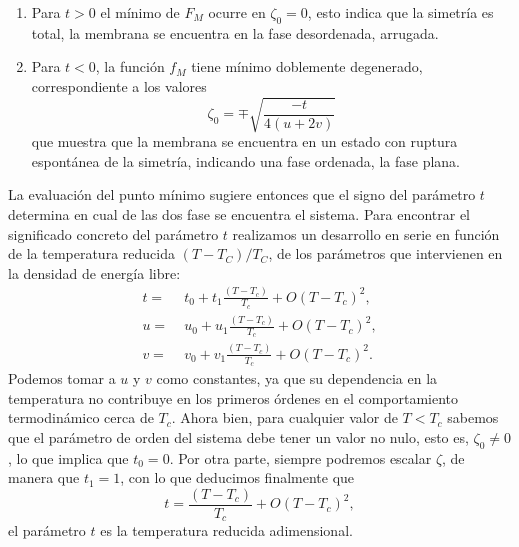 \begin{enumerate}
\item Para $t>0$ el mínimo de $F_M$ ocurre en $\zeta_0=0$, esto indica que la
  simetría es total, la membrana se encuentra en la fase desordenada,
  arrugada.
\item Para $t<0$, la función $f_M$ tiene mínimo doblemente
  degenerado, correspondiente a los valores
  \begin{equation}\label{zeta_0}
    \zeta_0=\mp \sqrt{\frac{-t}{4(u+2v)}}
  \end{equation}
  que muestra que la membrana se encuentra en un estado con ruptura espontánea
  de la simetría, indicando una fase ordenada, la fase plana. 
\end{enumerate}

La evaluación del punto mínimo sugiere entonces que el
signo del parámetro $t$ determina en cual de las dos fase se encuentra el
sistema. Para encontrar el significado concreto del parámetro $t$
realizamos un desarrollo en serie en función de la temperatura reducida
$(T-T_C)/T_C$, de los parámetros que intervienen en la densidad de energía libre:
\begin{align*}
t=&\; t_0+t_1\frac{(T-T_c)}{T_c}+O(T-T_c)^2,\\
u=&\; u_0+u_1\frac{(T-T_c)}{T_c}+O(T-T_c)^2,\\
v=&\; v_0+v_1\frac{(T-T_c)}{T_c}+O(T-T_c)^2.
\end{align*}
Podemos tomar a $u$ y $v$ como constantes, ya que su dependencia en la 
temperatura no contribuye en los primeros órdenes en el comportamiento
termodinámico cerca de $T_c$. Ahora bien,
para cualquier valor de $T\!<\!T_c$ sabemos que el parámetro de orden del
sistema debe tener un valor no nulo, esto es, $\zeta_0\!\neq\! 0$, lo que
implica que $t_0=0$. Por otra parte, siempre podremos escalar $\zeta$, 
de manera que $t_1=1$, con lo que deducimos finalmente que
\begin{equation*}
t=\frac{(T-T_c)}{T_c}+O(T-T_c)^2,
\end{equation*}
el parámetro $t$ es la temperatura reducida adimensional.



